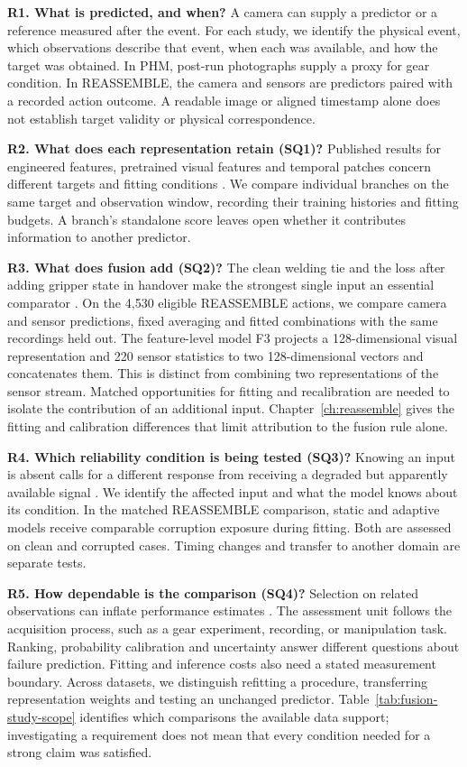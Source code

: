 \textbf{R1. What is predicted, and when?} A camera can supply a predictor or a
reference measured after the event. For each study, we identify the physical event,
which observations describe that event, when each was available, and how the target
was obtained. In PHM, post-run photographs supply a proxy for gear condition. In
REASSEMBLE, the camera and sensors are predictors paired with a recorded action
outcome. A readable image or aligned timestamp alone does not establish target
validity or physical correspondence.

\textbf{R2. What does each representation retain (SQ1)?} Published results for
engineered features, pretrained visual features and temporal patches concern
different targets and fitting conditions
\parencite{Horwitz2023Back,Roth2022Towards,Nie2023PatchTST}. We compare individual
branches on the same target and observation window, recording their training
histories and fitting budgets. A branch's standalone score leaves open whether it
contributes information to another predictor.

\textbf{R3. What does fusion add (SQ2)?} The clean welding tie and the loss after
adding gripper state in handover make the strongest single input an essential
comparator \parencite{Hua2026Weld,Thoduka2024Handover}. On the 4,530 eligible
REASSEMBLE actions, we compare camera and sensor predictions, fixed averaging and
fitted combinations with the same recordings held out. The feature-level model F3
projects a 128-dimensional visual representation and 220 sensor statistics to two
128-dimensional vectors and concatenates them. This is distinct from combining
two representations of the sensor stream. Matched opportunities for fitting and
recalibration are needed to isolate the contribution of an additional input.
Chapter~\ref{ch:reassemble} gives the fitting and calibration differences that
limit attribution to the fusion rule alone.

\textbf{R4. Which reliability condition is being tested (SQ3)?} Knowing an input is
absent calls for a different response from receiving a degraded but apparently
available signal \parencite{P026,Zhang2023QMF}. We identify the affected input and
what the model knows about its condition. In the matched REASSEMBLE comparison,
static and adaptive models receive comparable corruption exposure during fitting.
Both are assessed on clean and corrupted cases. Timing changes and transfer to
another domain are separate tests.

\textbf{R5. How dependable is the comparison (SQ4)?} Selection on related
observations can inflate performance estimates \parencite{P004,P017}. The
assessment unit follows the acquisition process, such as a gear experiment,
recording, or manipulation task. Ranking, probability calibration and uncertainty
answer different questions about failure prediction. Fitting and inference costs
also need a stated measurement boundary. Across datasets, we distinguish refitting
a procedure, transferring representation weights and testing an unchanged
predictor. Table~\ref{tab:fusion-study-scope} identifies which comparisons the
available data support; investigating a requirement does not mean that every
condition needed for a strong claim was satisfied.

